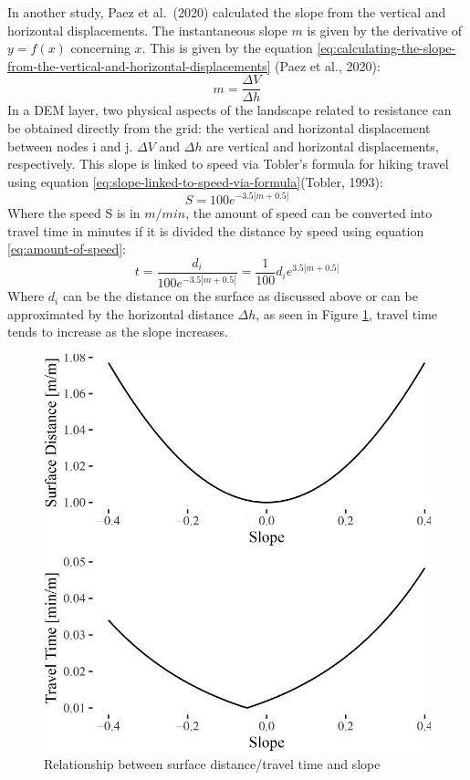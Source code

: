 \documentclass[12pt,twoside]{reedthesis}
\begin{document}
In another study, Paez et al.~(2020) calculated the slope from the vertical and horizontal displacements. The instantaneous slope \(m\) is given by the derivative of \(y = f(x)\) concerning \(x\). This is given by the equation \eqref{eq:calculating-the-slope-from-the-vertical-and-horizontal-displacements} (Paez et al., 2020):
\begin{equation}
m = \frac{\Delta V}{\Delta h}
\label{eq:calculating-the-slope-from-the-vertical-and-horizontal-displacements}
\end{equation}
In a DEM layer, two physical aspects of the landscape related to resistance can be obtained directly from the grid: the vertical and horizontal displacement between nodes i and j. \(\Delta V\) and \(\Delta h\) are vertical and horizontal displacements, respectively. This slope is linked to speed via Tobler's formula for hiking travel using equation \eqref{eq:slope-linked-to-speed-via-formula}(Tobler, 1993):
\begin{equation}
S = 100 e^{-3.5 |m + 0.5|}
\label{eq:slope-linked-to-speed-via-formula}
\end{equation}
Where the speed S is in \(m/min\), the amount of speed can be converted into travel time in minutes if it is divided the distance by speed using equation \eqref{eq:amount-of-speed}:
\begin{equation}
t = \frac{d_i}{100 e^{-3.5 |m + 0.5|}} = \frac{1}{100} d_i e^{3.5 |m + 0.5|}
\label{eq:amount-of-speed}
\end{equation}
Where \(d_i\) can be the distance on the surface as discussed above or can be approximated by the horizontal distance \(\Delta h\), as seen in Figure \ref{fig:surface-distance}, travel time tends to increase as the slope increases.
\begin{figure}

{\centering \includegraphics[width=0.9\linewidth]{images/Fig.3} 

}

\caption{Relationship between surface distance/travel time and slope}\label{fig:surface-distance}
\end{figure}
\newpage
\end{document}

